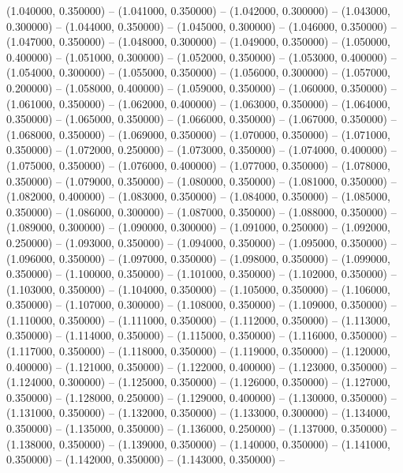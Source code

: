 (1.040000, 0.350000) -- 
(1.041000, 0.350000) -- 
(1.042000, 0.300000) -- 
(1.043000, 0.300000) -- 
(1.044000, 0.350000) -- 
(1.045000, 0.300000) -- 
(1.046000, 0.350000) -- 
(1.047000, 0.350000) -- 
(1.048000, 0.300000) -- 
(1.049000, 0.350000) -- 
(1.050000, 0.400000) -- 
(1.051000, 0.300000) -- 
(1.052000, 0.350000) -- 
(1.053000, 0.400000) -- 
(1.054000, 0.300000) -- 
(1.055000, 0.350000) -- 
(1.056000, 0.300000) -- 
(1.057000, 0.200000) -- 
(1.058000, 0.400000) -- 
(1.059000, 0.350000) -- 
(1.060000, 0.350000) -- 
(1.061000, 0.350000) -- 
(1.062000, 0.400000) -- 
(1.063000, 0.350000) -- 
(1.064000, 0.350000) -- 
(1.065000, 0.350000) -- 
(1.066000, 0.350000) -- 
(1.067000, 0.350000) -- 
(1.068000, 0.350000) -- 
(1.069000, 0.350000) -- 
(1.070000, 0.350000) -- 
(1.071000, 0.350000) -- 
(1.072000, 0.250000) -- 
(1.073000, 0.350000) -- 
(1.074000, 0.400000) -- 
(1.075000, 0.350000) -- 
(1.076000, 0.400000) -- 
(1.077000, 0.350000) -- 
(1.078000, 0.350000) -- 
(1.079000, 0.350000) -- 
(1.080000, 0.350000) -- 
(1.081000, 0.350000) -- 
(1.082000, 0.400000) -- 
(1.083000, 0.350000) -- 
(1.084000, 0.350000) -- 
(1.085000, 0.350000) -- 
(1.086000, 0.300000) -- 
(1.087000, 0.350000) -- 
(1.088000, 0.350000) -- 
(1.089000, 0.300000) -- 
(1.090000, 0.300000) -- 
(1.091000, 0.250000) -- 
(1.092000, 0.250000) -- 
(1.093000, 0.350000) -- 
(1.094000, 0.350000) -- 
(1.095000, 0.350000) -- 
(1.096000, 0.350000) -- 
(1.097000, 0.350000) -- 
(1.098000, 0.350000) -- 
(1.099000, 0.350000) -- 
(1.100000, 0.350000) -- 
(1.101000, 0.350000) -- 
(1.102000, 0.350000) -- 
(1.103000, 0.350000) -- 
(1.104000, 0.350000) -- 
(1.105000, 0.350000) -- 
(1.106000, 0.350000) -- 
(1.107000, 0.300000) -- 
(1.108000, 0.350000) -- 
(1.109000, 0.350000) -- 
(1.110000, 0.350000) -- 
(1.111000, 0.350000) -- 
(1.112000, 0.350000) -- 
(1.113000, 0.350000) -- 
(1.114000, 0.350000) -- 
(1.115000, 0.350000) -- 
(1.116000, 0.350000) -- 
(1.117000, 0.350000) -- 
(1.118000, 0.350000) -- 
(1.119000, 0.350000) -- 
(1.120000, 0.400000) -- 
(1.121000, 0.350000) -- 
(1.122000, 0.400000) -- 
(1.123000, 0.350000) -- 
(1.124000, 0.300000) -- 
(1.125000, 0.350000) -- 
(1.126000, 0.350000) -- 
(1.127000, 0.350000) -- 
(1.128000, 0.250000) -- 
(1.129000, 0.400000) -- 
(1.130000, 0.350000) -- 
(1.131000, 0.350000) -- 
(1.132000, 0.350000) -- 
(1.133000, 0.300000) -- 
(1.134000, 0.350000) -- 
(1.135000, 0.350000) -- 
(1.136000, 0.250000) -- 
(1.137000, 0.350000) -- 
(1.138000, 0.350000) -- 
(1.139000, 0.350000) -- 
(1.140000, 0.350000) -- 
(1.141000, 0.350000) -- 
(1.142000, 0.350000) -- 
(1.143000, 0.350000) -- 
